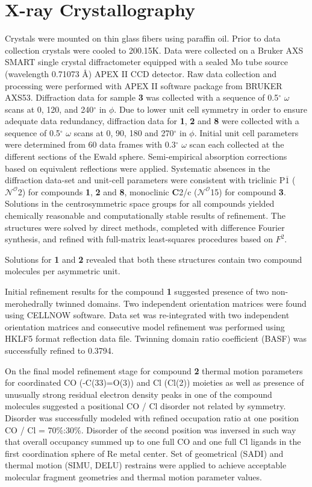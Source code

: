 \section{X-ray Crystallography}\label{sec.xray}
Crystals were mounted on thin glass fibers using paraffin oil. Prior to data collection crystals were cooled to 200.15K. Data were collected on a Bruker AXS SMART single crystal diffractometer equipped with a sealed Mo tube source (wavelength 0.71073 \r{A}) APEX II CCD detector. Raw data collection and processing were performed with APEX II software package from BRUKER AXS53. Diffraction data for sample \textbf{3} was collected with a sequence of 0.5$^\circ$ $\omega$ scans at 0, 120, and 240$^\circ$ in $\phi$. Due to lower unit cell symmetry in order to ensure adequate data redundancy, diffraction data for \textbf{1}, \textbf{2} and \textbf{8} were collected with a sequence of 0.5$^\circ$ $\omega$ scans at 0, 90, 180 and 270$^\circ$ in $\phi$. Initial unit cell parameters were determined from 60 data frames with 0.3$^\circ$ $\omega$ scan each collected at the different sections of the Ewald sphere. Semi-empirical absorption corrections based on equivalent reflections were applied\autocite{blessing1995}. Systematic absences in the diffraction data-set and unit-cell parameters were consistent with triclinic P$\overline{1}$ ($\mathcal{N} ^\mathcal{O}$2) for compounds \textbf{1}, \textbf{2} and \textbf{8}, monoclinic \textbf{C}2/c ($\mathcal{N} ^\mathcal{O}$15) for compound \textbf{3}. Solutions in the centrosymmetric space groups for all compounds yielded chemically reasonable and computationally stable results of refinement. The structures were solved by direct methods, completed with difference Fourier synthesis, and refined with full-matrix least-squares procedures based on $F^2$.

Solutions for \textbf{1} and \textbf{2} revealed that both these structures contain two compound molecules per asymmetric unit.

Initial refinement results for the compound \textbf{1} suggested presence of two non-merohedrally twinned domains. Two independent orientation matrices were found using CELL\textunderscore NOW software\autocite{cellnow}. Data set was re-integrated with two independent orientation matrices and consecutive model refinement was performed using HKLF5 format reflection data file. Twinning domain ratio coefficient (BASF) was successfully refined to 0.3794.

On the final model refinement stage for compound \textbf{2} thermal motion parameters for coordinated CO (-C(33)=O(3)) and Cl (Cl(2)) moieties as well as presence of unusually strong residual electron density peaks in one of the compound molecules suggested a positional CO / Cl disorder not related by symmetry. Disorder was successfully modeled with refined occupation ratio at one position CO / Cl = 70\%:30\%. Disorder of the second position was inversed in such way that overall occupancy summed up to one full CO and one full Cl ligands in the first coordination sphere of Re metal center. Set of geometrical (SADI) and thermal motion (SIMU, DELU) restrains were applied to achieve acceptable molecular fragment geometries and thermal motion parameter values.

